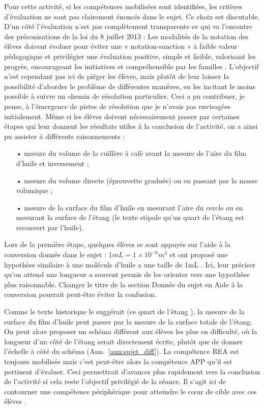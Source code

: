\documentclass[12pt,a4paper, fleqn]{report}
\newcommand{\app}{\colorbox{bleu_c}{\textcolor{bleu_f}{APP}}}
\newcommand{\rea}{\colorbox{yellow_c}{\textcolor{yellow_f}{REA}}}
\begin{document}
Pour cette activité, si les compétences mobilisées sont identifiées, les critères d'évaluation ne sont pas clairement énoncés dans le sujet.
Ce choix est discutable.
D'un côté l'évaluation n'est pas complètement transparente  ce qui va l'encontre des préconisations de la loi du 8 juillet 2013 \cite{Loi2013} : \og Les modalités de la notation des élèves doivent évoluer pour éviter une « notation-sanction » à faible valeur pédagogique et privilégier une évaluation positive, simple et lisible, valorisant les progrès, encourageant les initiatives et compréhensible par les familles \fg{}.
L'objectif n'est cependant pas ici de piéger les élèves, mais plutôt de leur laisser la possibilité d'aborder le problème de différentes manières, en les incitant le moins possible à suivre un chemin de résolution particulier.
Ceci a pu contribuer, je pense, à l'émergence de pistes de résolution que je n'avais pas envisagées initialement.
Même si les élèves doivent nécessairement passer par certaines étapes qui leur donnent les résultats utiles à la conclusion de l'activité, on a ainsi pu assister à différents raisonnements : 
\begin{itemize}
\item[•] mesure du volume de la cuillère à café avant la mesure de l'aire du film d'huile et inversement ;
\item[•] mesure du volume directe (éprouvette graduée) ou en passant par la masse volumique ;
\item[•] mesure de la surface du film d'huile en mesurant l'aire du cercle ou en mesurant la surface de l'étang (le texte stipule qu'un quart de l'étang est recouvert par l'huile).
\end{itemize}

Lors de la première étape, quelques élèves se sont appuyés sur l'aide à la conversion donnée dans le sujet : $\unit{1}{mL} = \unit{1 \times 10^{-6}}{m^3} $ et ont proposé une hypothèse similaire à \og une molécule d'huile a une taille de \unit{1}{mL} \fg{}.
Ici, leur préciser qu'on attend une longueur a souvent permis de les orienter vers une hypothèse plus raisonnable.
Changer le titre de la section \og Donnée \fg{} du sujet en \og Aide à la conversion \fg{} pourrait peut-être éviter la confusion.

Comme le texte historique le suggérait (\og ce quart de l'étang \fg{}), la mesure de la surface du film d'huile peut passer par la mesure de la surface totale de l'étang.
On peut alors proposer un schéma différent aux élèves les plus en difficulté, où la longueur d'un côté de l'étang serait directement écrite, plutôt que de donner l'échelle à côté du schéma (Ann.~\ref{ann:sujet_diff}).
La compétence \rea{} est toujours mobilisée mais c'est peut-être alors la compétence \app{} qu'il est pertinent d'évaluer.
Ceci permettrait d'avancer plus rapidement vers la conclusion de l'activité si cela reste l'objectif privilégié de la séance.
Il s'agit ici de contourner une compétence périphérique pour atteindre le cœur de cible avec ces élèves \cite{Benoit2012}.
\end{document}
